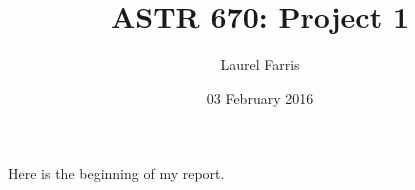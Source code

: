 \documentclass[12pt]{article}
\title{ASTR 670: Project 1}
\author{Laurel Farris}
\date{03 February 2016}
\begin{document}
\maketitle

Here is the beginning of my report.
\end{document}
